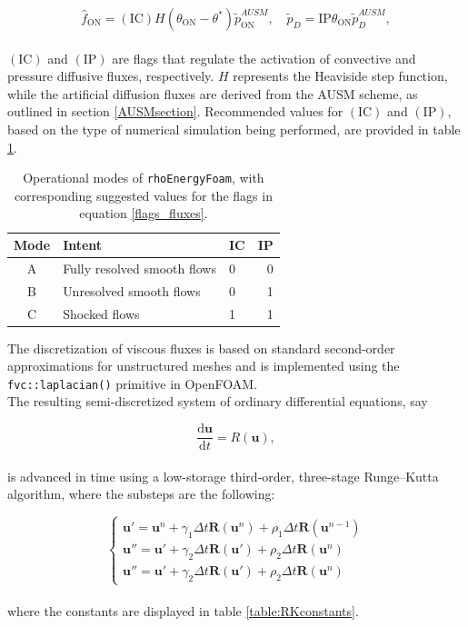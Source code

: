 \documentclass[a5paper]{sapthesis}
\begin{document}
	\begin{equation}
		\hat{f}_{\text{ON}} = (\text{IC}) H (\theta_{\text{ON}} - \theta^*) \tilde{p}_{\text{ON}}^{AUSM}, \quad
		\tilde{p}_D = \text{IP} \theta_{\text{ON}} \tilde{p}_D^{AUSM},
		\label{flags_fluxes}
	\end{equation}
	\\
	$(\text{IC})$ and $(\text{IP})$ are flags that regulate the activation of convective and pressure diffusive fluxes, respectively. $H$ represents the Heaviside step function, while the artificial diffusion fluxes are derived from the AUSM scheme, as outlined in section \ref{AUSMsection}. Recommended values for $(\text{IC})$ and $(\text{IP})$, based on the type of numerical simulation being performed, are provided in table \ref{REF_modes}.  
	
	\begin{table}[h]
		\centering
		\renewcommand{\arraystretch}{1.4} %
		\begin{tabular}{c l l r}
			\hline
			\textbf{Mode} & \textbf{Intent} & \textbf{IC} & \textbf{IP} \\
			\hline
			A & Fully resolved smooth flows & 0 & 0 \\
			B & Unresolved smooth flows & 0 & 1 \\
			C & Shocked flows & 1 & 1 \\
			\hline
		\end{tabular}
				\vspace{3mm}
		\caption{Operational modes of \texttt{rhoEnergyFoam}, with corresponding	suggested values for the flags in equation \ref{flags_fluxes}.}
		\label{REF_modes}
	\end{table}
	\noindent The discretization of viscous fluxes is based on standard second-order approximations for unstructured meshes \cite{hirsch2007numerical} and is implemented using the \texttt{fvc::laplacian()} primitive in OpenFOAM.
	\\The resulting semi-discretized system of ordinary differential equations, say 
	
	\begin{equation}
		\frac{\mathrm{d} \mathbf{u}}{\mathrm{d}t} = R(\mathbf{u}),
	\end{equation}
	\\
	is advanced in time using a low-storage	third-order, three-stage Runge–Kutta algorithm, where the substeps are the following:
	
	\begin{equation}
		\begin{cases}
			\mathbf{u}' = \mathbf{u}^n + \gamma_1 \Delta t\mathbf{R}(\mathbf{u}^n) + \rho_1 \Delta t\mathbf{R}(\mathbf{u}^{n-1})\\
			\mathbf{u}'' = \mathbf{u}' + \gamma_2 \Delta t\mathbf{R}(\mathbf{u}') + \rho_2 \Delta t\mathbf{R}(\mathbf{u}^n)\\
			\mathbf{u}'' = \mathbf{u}' + \gamma_2 \Delta t\mathbf{R}(\mathbf{u}') + \rho_2 \Delta t\mathbf{R}(\mathbf{u}^n)
		\end{cases}	
	\end{equation}
	\\
	where the constants are displayed in table \ref{table:RKconstants}.
	
\end{document}
